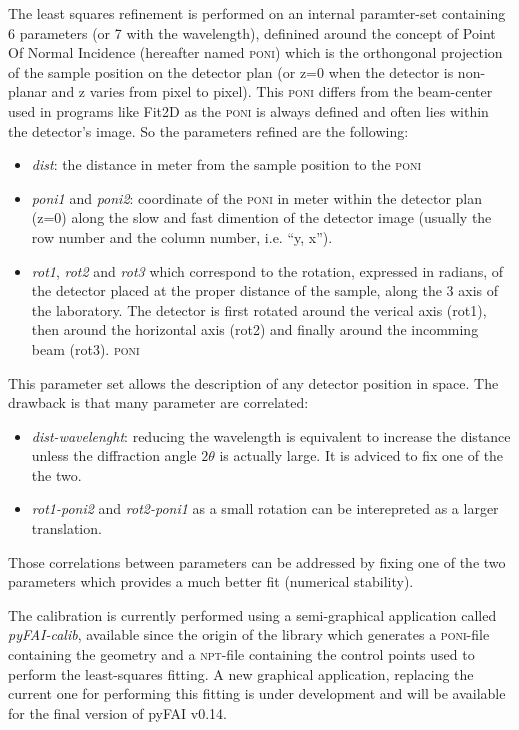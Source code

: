 \documentclass{iucr}              %
\begin{document}
The least squares refinement is performed on an internal paramter-set containing
6  parameters (or 7 with the wavelength), definined around the
concept of Point Of Normal Incidence (hereafter named \textsc{poni}) which is
the orthongonal projection  of the sample position on the detector plan 
(or z=0 when the detector is non-planar and z varies from pixel to pixel).
This \textsc{poni} differs from the beam-center used in programs like
Fit2D\cite{fit2d} as the \textsc{poni} is always defined and often lies within
the detector's image.
So the parameters refined are the following:
\begin{itemize}
  \item \textit{dist}: the distance in meter from the sample position to the
  \textsc{poni}
  \item \textit{poni1} and \textit{poni2}: coordinate of the
  \textsc{poni} in meter within the detector plan (z=0) along the slow and fast
  dimention of the detector image (usually the row number and the column
  number, i.e. ``y, x'').
  \item \textit{rot1}, \textit{rot2} and \textit{rot3} which correspond to the
  rotation, expressed in radians, of the detector placed at the proper
  distance of the sample, along the 3 axis of the laboratory. The detector is
  first rotated around the verical axis (rot1), then around the horizontal axis
  (rot2) and finally around the incomming beam (rot3). 
  \textsc{poni}
\end{itemize}

This parameter set allows the description of any detector position in space.
The drawback is that many parameter are correlated: 
\begin{itemize}
  \item \textit{dist-wavelenght}: reducing the wavelength is equivalent to
  increase the distance unless the diffraction angle $2\theta$ is actually
  large. It is adviced to fix one of the the two. 
  \item \textit{rot1-poni2} and \textit{rot2-poni1} as a small rotation can be
  interepreted as a larger translation. 
\end{itemize}
Those correlations between parameters can be addressed by fixing one of
the two parameters which provides a much better fit (numerical stability).

The calibration is currently performed using a semi-graphical
application called \textit{pyFAI-calib}, available since the origin of the library 
which generates a \textsc{poni}-file containing the geometry and a
\textsc{npt}-file containing the control points used to perform the
least-squares fitting.
A new graphical application, replacing the current one for performing this
fitting is under development and will be available for the final version of
pyFAI v0.14.
\end{document}
